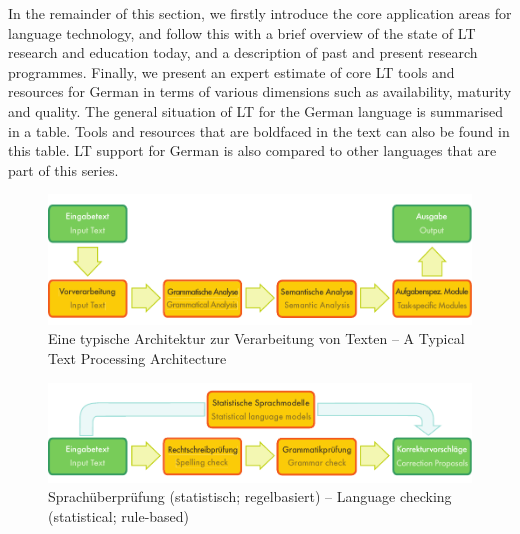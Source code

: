 \documentclass[]{../../metanetpaper}
\begin{document}
\begin{Parallel}[c]{79mm}{78mm}
{   In the remainder of this section, we firstly introduce the core application areas for language technology, and follow this with a brief overview of the state of LT research and education today, and a description of past and present research programmes. Finally, we present an expert estimate of core LT tools and resources for German in terms of various dimensions such as availability, maturity and quality. The general situation of LT for the German language is summarised in a table. Tools and resources that are boldfaced in the text can also be found in this table. LT support for German is also compared to other languages that are part of this series.
  }
  \ParallelPar
  \clearpage
\begin{figure}[h!]
  \center
  \includegraphics[width=\textwidth]{../_media/text_processing_app_architecture}
  \caption{Eine typische Architektur zur Verarbeitung von Texten -- A Typical Text Processing Architecture}
  \label{fig:textprocessingarch}
\end{figure}
  
  
  \ParallelPar

\clearpage

\begin{figure}[h!]
  \center
  \includegraphics[width=\textwidth]{../_media/language_checking}
  \caption{Sprachüberprüfung (statistisch; regelbasiert) -- Language checking (statistical; rule-based)}
  \label{fig:langcheckingaarch}
\end{figure}


\end{Parallel}
\end{document}
